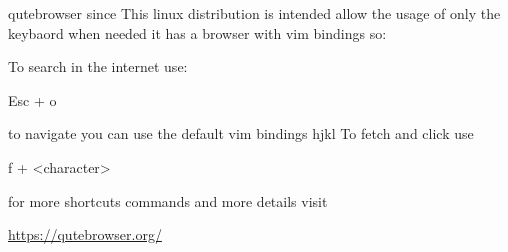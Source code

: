 \begin{section}{qutebrowser}
	since This linux distribution is intended allow the usage of only the keybaord when needed it has a browser with vim bindings
	so:

	To search in the internet use:

	\<Esc\> + o

	to navigate you can use the default vim bindings hjkl
	To fetch and click use

	f + <character>

	for more shortcuts commands and more details visit

	\url{https://qutebrowser.org/}


\end{section}
